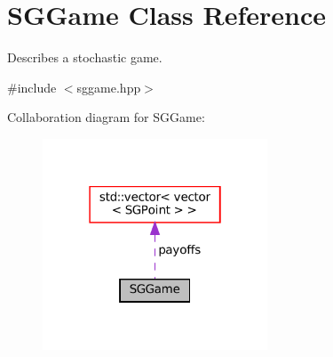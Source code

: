 \hypertarget{classSGGame}{}\section{S\+G\+Game Class Reference}
\label{classSGGame}


Describes a stochastic game.  




{\ttfamily \#include $<$sggame.\+hpp$>$}



Collaboration diagram for S\+G\+Game\+:
\nopagebreak
\begin{figure}[H]
\begin{center}
\leavevmode
\includegraphics[width=190pt]{classSGGame__coll__graph}
\end{center}
\end{figure}
